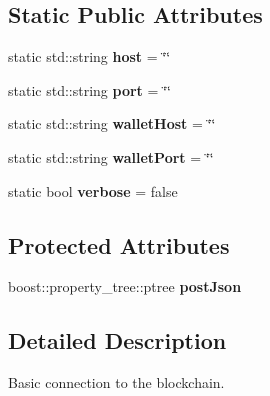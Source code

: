 \subsection*{Static Public Attributes}
\begin{DoxyCompactItemize}
\item 
\mbox{\label{classtokenika_1_1eosc_1_1_eosc_command_a82163846139ac5fd47ffe3cb68251d4e}} 
static std\+::string {\bfseries host} = \char`\"{}\char`\"{}
\item 
\mbox{\label{classtokenika_1_1eosc_1_1_eosc_command_a8a10e9cc90a957a70f40a63c37581452}} 
static std\+::string {\bfseries port} = \char`\"{}\char`\"{}
\item 
\mbox{\label{classtokenika_1_1eosc_1_1_eosc_command_a59e21016dc35f824b680b45a4be4b2e0}} 
static std\+::string {\bfseries wallet\+Host} = \char`\"{}\char`\"{}
\item 
\mbox{\label{classtokenika_1_1eosc_1_1_eosc_command_abd597bd241a7b1f371d46c42dd8daa53}} 
static std\+::string {\bfseries wallet\+Port} = \char`\"{}\char`\"{}
\item 
\mbox{\label{classtokenika_1_1eosc_1_1_eosc_command_a32486030c8ca151b1492c124b6d380d0}} 
static bool {\bfseries verbose} = false
\end{DoxyCompactItemize}
\subsection*{Protected Attributes}
\begin{DoxyCompactItemize}
\item 
\mbox{\label{classtokenika_1_1eosc_1_1_eosc_command_a1642782c91f4877a8fba395324fb7337}} 
boost\+::property\+\_\+tree\+::ptree {\bfseries post\+Json}
\end{DoxyCompactItemize}


\subsection{Detailed Description}
Basic connection to the blockchain. 

